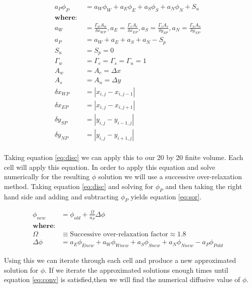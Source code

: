 \documentclass[cleanfoot,cleanhead,twocolumn,10pt,notitlepage]{asme2e}
\begin{document}
\begin{equation}
\begin{aligned}
a_P\phi_P &= a_W\phi_W + a_E\phi_E + a_S\phi_S + a_N\phi_N + S_u \\
\textbf{where: } \\
a_W &= \frac{\Gamma_w A_w}{\delta x_{WP}},
a_E = \frac{\Gamma_e A_e}{\delta x_{EP}},
a_S = \frac{\Gamma_s A_s}{\delta y_{SP}},
a_N = \frac{\Gamma_n A_n}{\delta y_{NP}}\\
a_P &= a_W + a_E + a_S + a_N - S_p\\
S_u &= S_p = 0 \\
\Gamma_w &= \Gamma_e = \Gamma_s = \Gamma_n = 1\\
A_w &= A_e = \Delta x\\
A_s &= A_n = \Delta y\\
\delta x_{WP} &= |x_{i,j}-x_{i,j-1}| \\
\delta x_{EP} &= |x_{i,j}-x_{i,j+1}| \\
\delta y_{SP} &= |y_{i,j}-y_{i-1,j}| \\
\delta y_{NP} &= |y_{i,j}-y_{i+1,j}| \\
\label{eq:disc}
\end{aligned}
\end{equation}

Taking equation \ref{eq:disc} we can apply this to our 20 by 20 finite volume.  Each cell will apply this equation.  In order to apply this equation and solve numerically for the resulting $\phi$ solution we will use a successive over-relaxation method.  Taking equation \ref{eq:disc} and solving for $\phi_P$ and then taking the right hand side and adding and subtracting $\phi_P$ yields equation \ref{eq:sor}.  

\begin{equation}
\begin{aligned}
\phi_{new} &= \phi_{old} + \frac{\Omega}{a_P} \Delta \phi \\
\textbf{where:}\\
\Omega &\equiv \text{Successive over-relaxation factor} \approx 1.8\\
\Delta \phi &= a_E\phi_{E new} + a_W\phi_{W new} + a_S\phi_{S new} + a_N\phi_{N new} - a_P\phi_{P old}
\label{eq:sor}
\end{aligned}
\end{equation}

Using this we can iterate through each cell and produce a new approximated solution for $\phi$.  If we iterate the approximated solutions enough times until equation \ref{eq:conv} is satisfied,then we will find the numerical diffusive value of $\phi$.  
\end{document}
